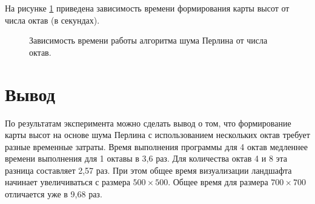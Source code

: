 На рисунке \ref{fg:ref2} приведена зависимость времени формирования карты высот от числа октав (в секундах).

\begin{figure}[H]
	\centering
	\captionsetup{justification=centering}
	\caption{Зависимость времени работы алгоритма шума Перлина от числа октав.} 
	\label{fg:ref2}
\end{figure} 

\section{Вывод}
По результатам эксперимента можно сделать вывод о том, что формирование карты высот на основе шума Перлина с использованием нескольких октав требует разные временные затраты. Время выполнения программы для 4 октав медленнее времени выполнения для 1 октавы в 3,6 раз. Для количества октав 4 и 8 эта разница составляет 2,57 раз. При этом общее время визуализации ландшафта начинает увеличиваться с размера $500\times500$. Общее время для размера $700\times700$ отличается уже в 9,68 раз.